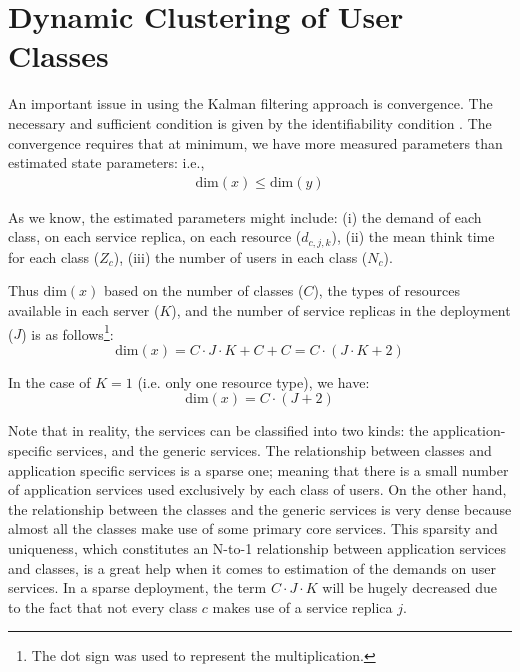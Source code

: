 	 
\section{Dynamic Clustering of User Classes}  
  An important issue in using the Kalman filtering approach is convergence. The necessary and sufficient condition is given by the identifiability condition \cite{tanizaki_nonlinear_1996,wan_unscented_2000,welch_introduction_1995}. The convergence requires that at minimum, we have more measured parameters than estimated state parameters: i.e., 
   \begin{align}  
   \text{dim}(x) \leq \text{dim}(y)    \label{eq:identifiability}
    \end{align}    

 As we know, the estimated parameters might include:   
  (i) the demand of each class, on each service replica, on each resource ($d_{c,j,k}$), 
  (ii) the mean think time for each class ($Z_c$), 
 (iii) the number of users in each class ($N_c$).  
 
	  
 Thus $\text{dim}(x)$ based on the number of classes ($C$), the types of resources available in each server ($K$), and the number of service replicas in the deployment ($J$) is as follows\footnote{The dot sign was used to represent the multiplication.}:                
 \[ \text{dim}(x)=C\cdot J\cdot K +  C + C = C\cdot (J\cdot K+2) \]
 
In the case of $K=1$ (i.e. only one resource type), we have: \[\text{dim}(x)=C\cdot (J+2)\] 

 Note that in reality, the services can be classified into two kinds: the application-specific services, and the generic services.
   The relationship between classes and application specific services is a sparse one; meaning that there is a small number of application services used exclusively by each class of users. On the other hand, the relationship between the classes and the generic services is very dense because almost all the classes make use of some primary core services. 
   This sparsity and uniqueness, which constitutes an N-to-1 relationship between application services and classes, is a great help when it comes to estimation of the demands on user services. 
 In a sparse deployment, the term $C\cdot J\cdot K$ will be hugely decreased due to the fact that  not every class $c$ makes use of a service replica $j$. 
 

